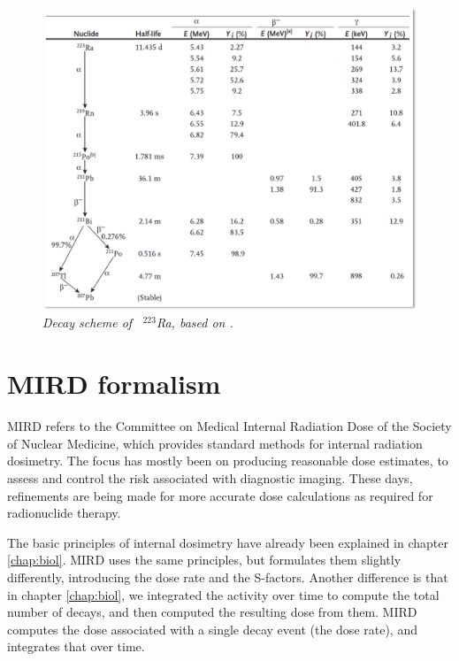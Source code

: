 \documentclass[11pt,oneside]{book}
\begin{document}
\begin{figure}[htb]
  \includegraphics[width=\textwidth]{figs/fig_223Ra.png}
  \centering
  \caption{\label{fig:223Ra} \emph{Decay scheme of \, $^{223}$Ra,
      based on \cite{Martin2006}.}}
\end{figure}


\section{MIRD formalism}
MIRD refers to the Committee on Medical Internal Radiation Dose of the
Society of Nuclear Medicine, which provides standard methods for
internal radiation dosimetry. The focus has mostly been on producing
reasonable dose estimates, to assess and control the risk associated
with diagnostic imaging. These days, refinements are being made for
more accurate dose calculations as required for radionuclide therapy.

The basic principles of internal dosimetry have already been explained
in chapter \ref{chap:biol}. MIRD uses the same principles, but
formulates them slightly differently, introducing the dose rate and
the S-factors. Another difference is that in chapter \ref{chap:biol},
we integrated the activity over time to compute the total number of
decays, and then computed the resulting dose from them. MIRD computes
the dose associated with a single decay event (the dose rate), and
integrates that over time.
\end{document}
